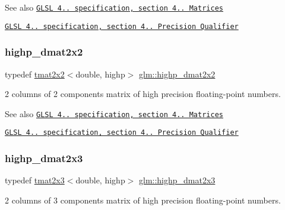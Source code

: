 \begin{DoxySeeAlso}{See also}
\href{http://www.opengl.org/registry/doc/GLSLangSpec.4.20.8.pdf}{\tt G\+L\+SL 4.. specification, section 4.. Matrices} 

\href{http://www.opengl.org/registry/doc/GLSLangSpec.4.20.8.pdf}{\tt G\+L\+SL 4.. specification, section 4.. Precision Qualifier} 
\end{DoxySeeAlso}
\mbox{\label{group__core__precision_gaf0445ee32625d26bf79bb84e3d5a5502}} 
\subsubsection{\texorpdfstring{highp\+\_\+dmat2x2}{highp\_dmat2x2}}
{\footnotesize\ttfamily typedef \hyperlink{structglm_1_1tmat2x2}{tmat2x2}$<$double, highp$>$ \hyperlink{group__core__precision_gaf0445ee32625d26bf79bb84e3d5a5502}{glm\+::highp\+\_\+dmat2x2}}

2 columns of 2 components matrix of high precision floating-\/point numbers.

\begin{DoxySeeAlso}{See also}
\href{http://www.opengl.org/registry/doc/GLSLangSpec.4.20.8.pdf}{\tt G\+L\+SL 4.. specification, section 4.. Matrices} 

\href{http://www.opengl.org/registry/doc/GLSLangSpec.4.20.8.pdf}{\tt G\+L\+SL 4.. specification, section 4.. Precision Qualifier} 
\end{DoxySeeAlso}
\mbox{\label{group__core__precision_ga29884defff6f7109b1e99ef8a6ce7e0a}} 
\subsubsection{\texorpdfstring{highp\+\_\+dmat2x3}{highp\_dmat2x3}}
{\footnotesize\ttfamily typedef \hyperlink{structglm_1_1tmat2x3}{tmat2x3}$<$double, highp$>$ \hyperlink{group__core__precision_ga29884defff6f7109b1e99ef8a6ce7e0a}{glm\+::highp\+\_\+dmat2x3}}

2 columns of 3 components matrix of high precision floating-\/point numbers.


